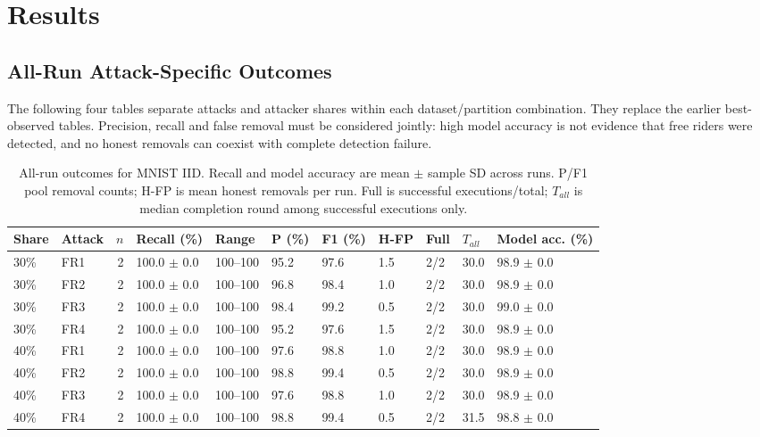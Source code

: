 \documentclass[conference]{IEEEtran}
\begin{document}
\section{Results}
\subsection{All-Run Attack-Specific Outcomes}
The following four tables separate attacks and attacker shares within each dataset/partition combination. They replace the earlier best-observed tables. Precision, recall and false removal must be considered jointly: high model accuracy is not evidence that free riders were detected, and no honest removals can coexist with complete detection failure.
\begin{table}[t]\centering\scriptsize
\setlength{\tabcolsep}{3.5pt}
\caption{All-run outcomes for MNIST IID. Recall and model accuracy are mean $\pm$ sample SD across runs. P/F1 pool removal counts; H-FP is mean honest removals per run. Full is successful executions/total; $T_{all}$ is median completion round among successful executions only.}
\begin{tabular}{llrllllllll}\toprule
Share & Attack & $n$ & Recall (\%) & Range & P (\%) & F1 (\%) & H-FP & Full & $T_{all}$ & Model acc. (\%) \\\midrule
30\% & FR1 & 2 & 100.0 $\pm$ 0.0 & 100--100 & 95.2 & 97.6 & 1.5 & 2/2 & 30.0 & 98.9 $\pm$ 0.0 \\
30\% & FR2 & 2 & 100.0 $\pm$ 0.0 & 100--100 & 96.8 & 98.4 & 1.0 & 2/2 & 30.0 & 98.9 $\pm$ 0.0 \\
30\% & FR3 & 2 & 100.0 $\pm$ 0.0 & 100--100 & 98.4 & 99.2 & 0.5 & 2/2 & 30.0 & 99.0 $\pm$ 0.0 \\
30\% & FR4 & 2 & 100.0 $\pm$ 0.0 & 100--100 & 95.2 & 97.6 & 1.5 & 2/2 & 30.0 & 98.9 $\pm$ 0.0 \\
40\% & FR1 & 2 & 100.0 $\pm$ 0.0 & 100--100 & 97.6 & 98.8 & 1.0 & 2/2 & 30.0 & 98.9 $\pm$ 0.0 \\
40\% & FR2 & 2 & 100.0 $\pm$ 0.0 & 100--100 & 98.8 & 99.4 & 0.5 & 2/2 & 30.0 & 98.9 $\pm$ 0.0 \\
40\% & FR3 & 2 & 100.0 $\pm$ 0.0 & 100--100 & 97.6 & 98.8 & 1.0 & 2/2 & 30.0 & 98.9 $\pm$ 0.0 \\
40\% & FR4 & 2 & 100.0 $\pm$ 0.0 & 100--100 & 98.8 & 99.4 & 0.5 & 2/2 & 31.5 & 98.8 $\pm$ 0.0 \\
\bottomrule\end{tabular}\end{table}
\end{document}
